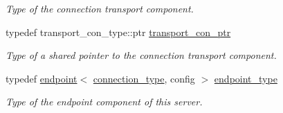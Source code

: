 \begin{DoxyCompactItemize}
\begin{DoxyCompactList}\small\item\em Type of the connection transport component. \end{DoxyCompactList}\item 
typedef transport\+\_\+con\+\_\+type\+::ptr \hyperlink{classwebsocketpp_1_1server_af23763a1899c4636299f59f130570aab}{transport\+\_\+con\+\_\+ptr}
\begin{DoxyCompactList}\small\item\em Type of a shared pointer to the connection transport component. \end{DoxyCompactList}\item 
typedef \hyperlink{classwebsocketpp_1_1endpoint}{endpoint}$<$ \hyperlink{classwebsocketpp_1_1server_a82d3d94b70a49b2073c9b3378ec7047c}{connection\+\_\+type}, config $>$ \hyperlink{classwebsocketpp_1_1server_a40f4d4bb132daf5164ccc290e9dbceb7}{endpoint\+\_\+type}
\begin{DoxyCompactList}\small\item\em Type of the endpoint component of this server. \end{DoxyCompactList}\end{DoxyCompactItemize}
